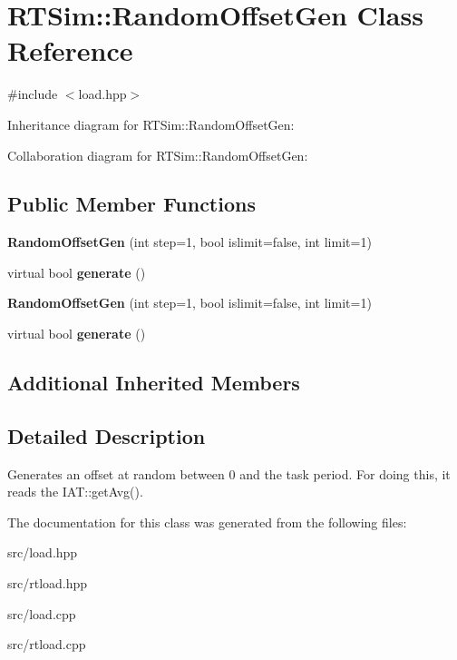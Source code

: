 \hypertarget{classRTSim_1_1RandomOffsetGen}{}\section{R\+T\+Sim\+:\+:Random\+Offset\+Gen Class Reference}
\label{classRTSim_1_1RandomOffsetGen}


{\ttfamily \#include $<$load.\+hpp$>$}



Inheritance diagram for R\+T\+Sim\+:\+:Random\+Offset\+Gen\+:


Collaboration diagram for R\+T\+Sim\+:\+:Random\+Offset\+Gen\+:
\subsection*{Public Member Functions}
\begin{DoxyCompactItemize}
\item 
{\bfseries Random\+Offset\+Gen} (int step=1, bool islimit=false, int limit=1)\hypertarget{classRTSim_1_1RandomOffsetGen_a930cdff973443f66aec08ac80c94c04c}{}\label{classRTSim_1_1RandomOffsetGen_a930cdff973443f66aec08ac80c94c04c}

\item 
virtual bool {\bfseries generate} ()\hypertarget{classRTSim_1_1RandomOffsetGen_a3a9411f4b93a3675fb380fc20a41e88a}{}\label{classRTSim_1_1RandomOffsetGen_a3a9411f4b93a3675fb380fc20a41e88a}

\item 
{\bfseries Random\+Offset\+Gen} (int step=1, bool islimit=false, int limit=1)\hypertarget{classRTSim_1_1RandomOffsetGen_a930cdff973443f66aec08ac80c94c04c}{}\label{classRTSim_1_1RandomOffsetGen_a930cdff973443f66aec08ac80c94c04c}

\item 
virtual bool {\bfseries generate} ()\hypertarget{classRTSim_1_1RandomOffsetGen_a0d293548e31fa93f074a9b710cc28d65}{}\label{classRTSim_1_1RandomOffsetGen_a0d293548e31fa93f074a9b710cc28d65}

\end{DoxyCompactItemize}
\subsection*{Additional Inherited Members}


\subsection{Detailed Description}
Generates an offset at random between 0 and the task period. For doing this, it reads the I\+A\+T\+::get\+Avg(). 

The documentation for this class was generated from the following files\+:\begin{DoxyCompactItemize}
\item 
src/load.\+hpp\item 
src/rtload.\+hpp\item 
src/load.\+cpp\item 
src/rtload.\+cpp\end{DoxyCompactItemize}
